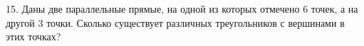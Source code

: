 15. Даны две параллельные прямые, на одной из которых отмечено 6 точек, а на другой 3 точки. Сколько существует различных треугольников с вершинами в этих точках?\\
